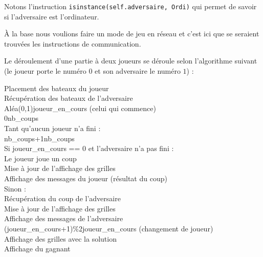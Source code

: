 Notons l'instruction \texttt{isinstance(self.adversaire, Ordi)} qui permet de savoir si l'adversaire est l'ordinateur.

\medskip

À la base nous voulions faire un mode de jeu en réseau et c'est ici que se seraient trouvées les instructions de communication.

\newpage

Le déroulement d'une partie à deux joueurs se déroule selon l'algorithme suivant (le joueur porte le numéro $0$ et son adversaire le numéro $1$) :

\begin{algo1}\label{algo_partie}
Placement des bateaux du joueur\\
Récupération des bateaux de l'adversaire\\
Aléa(0,1)\sto joueur\_en\_cours (celui qui commence)\\
0\sto nb\_coups\\
Tant qu'aucun joueur n'a fini :\\
nb\_coups+1\sto nb\_coups\\
Si joueur\_en\_cours == 0 et l'adversaire n'a pas fini :\\
Le joueur joue un coup\\
Mise à jour de l'affichage des grilles\\
Affichage des messages du joueur (résultat du coup)\\
Sinon :\\
Récupération du coup de l'adversaire\\
Mise à jour de l'affichage des grilles\\
Affichage des messages de l'adversaire\\
(joueur\_en\_cours+1)\%2\sto joueur\_en\_cours (changement de joueur)\\
Affichage des grilles avec la solution\\
Affichage du gagnant\\
\end{algo1}